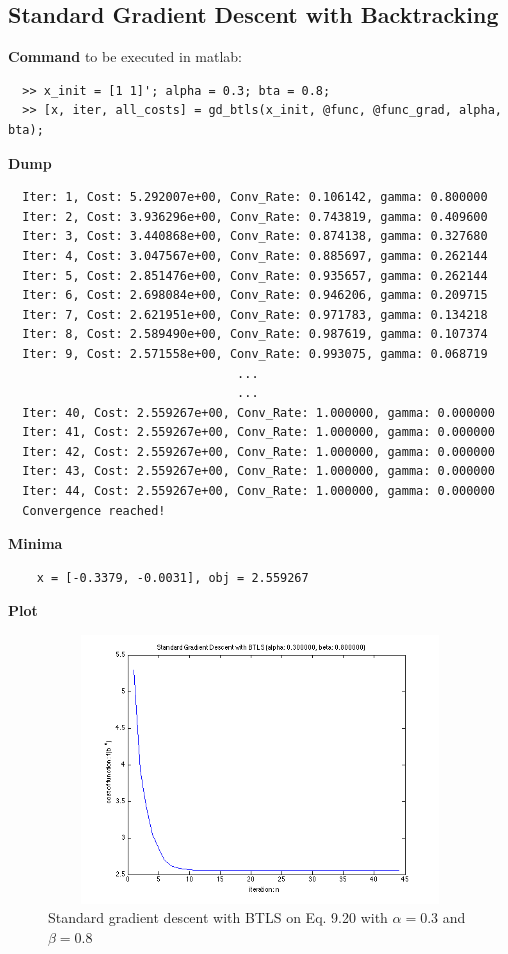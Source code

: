 \documentclass[11pt,a4paper]{article}
\begin{document}
\subsection{Standard Gradient Descent with Backtracking}
{\bf Command} to be executed in matlab:
\begin{verbatim}
  >> x_init = [1 1]'; alpha = 0.3; bta = 0.8;
  >> [x, iter, all_costs] = gd_btls(x_init, @func, @func_grad, alpha, bta);
\end{verbatim}
{\bf Dump}
\begin{verbatim}
  Iter: 1, Cost: 5.292007e+00, Conv_Rate: 0.106142, gamma: 0.800000
  Iter: 2, Cost: 3.936296e+00, Conv_Rate: 0.743819, gamma: 0.409600
  Iter: 3, Cost: 3.440868e+00, Conv_Rate: 0.874138, gamma: 0.327680
  Iter: 4, Cost: 3.047567e+00, Conv_Rate: 0.885697, gamma: 0.262144
  Iter: 5, Cost: 2.851476e+00, Conv_Rate: 0.935657, gamma: 0.262144
  Iter: 6, Cost: 2.698084e+00, Conv_Rate: 0.946206, gamma: 0.209715
  Iter: 7, Cost: 2.621951e+00, Conv_Rate: 0.971783, gamma: 0.134218
  Iter: 8, Cost: 2.589490e+00, Conv_Rate: 0.987619, gamma: 0.107374
  Iter: 9, Cost: 2.571558e+00, Conv_Rate: 0.993075, gamma: 0.068719
                                ...
                                ...
  Iter: 40, Cost: 2.559267e+00, Conv_Rate: 1.000000, gamma: 0.000000
  Iter: 41, Cost: 2.559267e+00, Conv_Rate: 1.000000, gamma: 0.000000
  Iter: 42, Cost: 2.559267e+00, Conv_Rate: 1.000000, gamma: 0.000000
  Iter: 43, Cost: 2.559267e+00, Conv_Rate: 1.000000, gamma: 0.000000
  Iter: 44, Cost: 2.559267e+00, Conv_Rate: 1.000000, gamma: 0.000000
  Convergence reached!
\end{verbatim}
{\bf Minima}
\begin{verbatim}
    x = [-0.3379, -0.0031], obj = 2.559267 
   \end{verbatim}
{\bf Plot}
\begin{figure}[h]
    \centering
    \includegraphics[width=4.6in,height=2.8in]{../ps2_matlab/1.png}
    \caption{Standard gradient descent with BTLS on
        Eq. 9.20 with $\alpha = 0.3$ and $\beta = 0.8$}
\end{figure}
\end{document}
